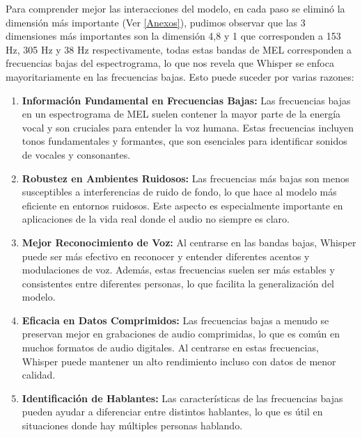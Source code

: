 \documentclass[conference]{IEEEtran}
\begin{document}
Para comprender mejor las interacciones del modelo, en cada paso se eliminó la dimensión más importante (Ver \ref{Anexos}), pudimos observar que las 3 dimensiones más importantes son la dimensión 4,8 y 1 que corresponden a 153 Hz, 305 Hz y 38 Hz respectivamente, todas estas bandas de MEL corresponden a frecuencias bajas del espectrograma, lo que nos revela que Whisper se enfoca mayoritariamente en las frecuencias bajas.
Esto puede suceder por varias razones:
\begin{enumerate}
    \item \textbf{Información Fundamental en Frecuencias Bajas:} Las frecuencias bajas en un espectrograma de MEL suelen contener la mayor parte de la energía vocal y son cruciales para entender la voz humana. Estas frecuencias incluyen tonos fundamentales y formantes, que son esenciales para identificar sonidos de vocales y consonantes.
    \item \textbf{Robustez en Ambientes Ruidosos:} Las frecuencias más bajas son menos susceptibles a interferencias de ruido de fondo, lo que hace al modelo más eficiente en entornos ruidosos. Este aspecto es especialmente importante en aplicaciones de la vida real donde el audio no siempre es claro.
    \item \textbf{Mejor Reconocimiento de Voz:} Al centrarse en las bandas bajas, Whisper puede ser más efectivo en reconocer y entender diferentes acentos y modulaciones de voz. Además, estas frecuencias suelen ser más estables y consistentes entre diferentes personas, lo que facilita la generalización del modelo.
   \item \textbf{Eficacia en Datos Comprimidos:} Las frecuencias bajas a menudo se preservan mejor en grabaciones de audio comprimidas, lo que es común en muchos formatos de audio digitales. Al centrarse en estas frecuencias, Whisper puede mantener un alto rendimiento incluso con datos de menor calidad.
   \item \textbf{Identificación de Hablantes:} Las características de las frecuencias bajas pueden ayudar a diferenciar entre distintos hablantes, lo que es útil en situaciones donde hay múltiples personas hablando.
\end{enumerate}
\end{document}
